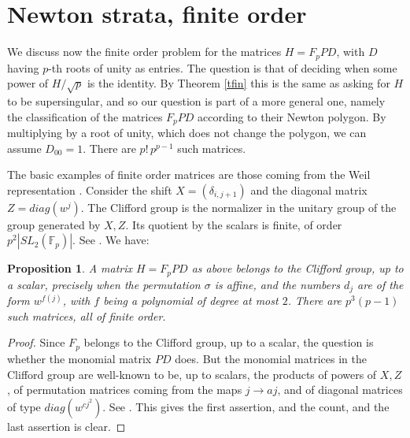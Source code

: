 \documentclass[11pt]{amsart}
\newtheorem{proposition}[theorem]{Proposition}
\theoremstyle{definition}
\begin{document}
\section{Newton strata, finite order}

We discuss now the finite order problem for the matrices $H=F_pPD$, with $D$ having $p$-th roots of unity as entries. The question is that of deciding when some power of $H/\sqrt{p}$ is the identity. By Theorem \ref{tfin} this is the same as asking for $H$ to be supersingular, and so our question is part of a more general one, namely the classification of the matrices $F_pPD$ according to their Newton polygon. By multiplying by a root of unity, which does not change the polygon, we can assume $D_{00}=1$. There are $p!\,p^{p-1}$ such matrices.

\medskip

The basic examples of finite order matrices are those coming from the Weil representation \cite{we3}. Consider the shift $X=(\delta_{i,j+1})$ and the diagonal matrix $Z=diag(w^j)$. The Clifford group is the normalizer in the unitary group of the group generated by $X,Z$. Its quotient by the scalars is finite, of order $p^2|SL_2(\mathbb F_p)|$. See \cite{app}. We have:

\begin{proposition}\label{pcliff}
A matrix $H=F_pPD$ as above belongs to the Clifford group, up to a scalar, precisely when the permutation $\sigma$ is affine, and the numbers $d_j$ are of the form $w^{f(j)}$, with $f$ being a polynomial of degree at most $2$. There are $p^3(p-1)$ such matrices, all of finite order.
\end{proposition}

\begin{proof}
Since $F_p$ belongs to the Clifford group, up to a scalar, the question is whether the monomial matrix $PD$ does. But the monomial matrices in the Clifford group are well-known to be, up to scalars, the products of powers of $X,Z$, of permutation matrices coming from the maps $j\to aj$, and of diagonal matrices of type $diag(w^{cj^2})$. See \cite{app}. This gives the first assertion, and the count, and the last assertion is clear.
\end{proof}
\end{document}
